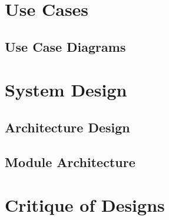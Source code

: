   \section{Use Cases}
\label{design:usecase}

\subsection{Use Case Diagrams}
\label{usecase:diagrams}

\section{System Design}
\label{design:system}

\subsection{Architecture Design}
\label{system:architecture-design}

\subsection{Module Architecture}
\label{system:module-architecture}

\section{Critique of Designs}
\label{design:critique}